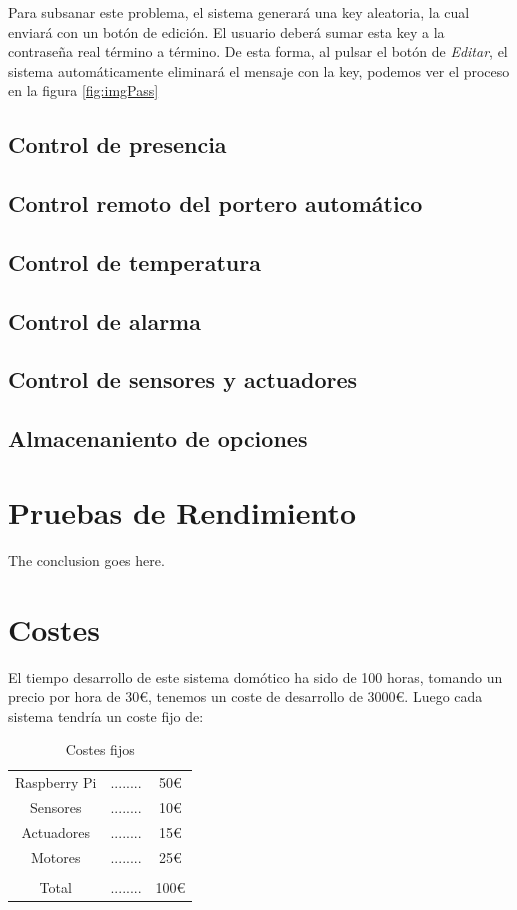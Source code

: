 \documentclass[10pt,journal,compsoc]{IEEEtran}
\begin{document}
Para subsanar este problema, el sistema generará una key aleatoria, la cual enviará con un botón de edición. El usuario deberá sumar esta key a la contraseña real término a término.
De esta forma, al pulsar el botón de \textit{Editar}, el sistema automáticamente eliminará el mensaje con la key, podemos ver el proceso en la figura \ref{fig:imgPass}

\subsection{Control de presencia}

\subsection{Control remoto del portero automático}

\subsection{Control de temperatura}

\subsection{Control de alarma}

\subsection{Control de sensores y actuadores}

\subsection{Almacenaniento de opciones}



\section{Pruebas de Rendimiento}
The conclusion goes here.

\section{Costes}
El tiempo desarrollo de este sistema domótico ha sido de 100 horas, tomando un precio por hora de 30\euro, tenemos un coste de desarrollo de 3000\euro.
Luego cada sistema tendría un coste fijo de:

\begin{table}[h]
\centering
\begin{tabular}{ccc}
Raspberry Pi & ........ & 50\euro \\
Sensores & ........ & 10\euro \\
Actuadores & ........ & 15\euro \\
Motores & ........ & 25\euro \\
\hline \\
Total & ........ & 100\euro \\
\end{tabular} 
\caption{Costes fijos}
\label{tab:CostesFij}
\end{table}
\end{document}
